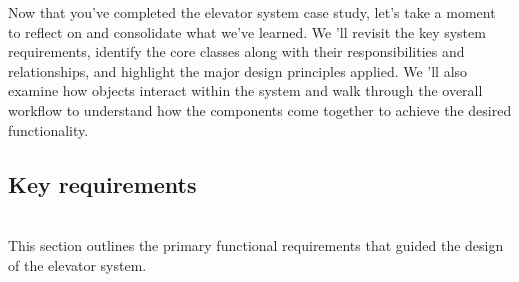 

Now that you've completed the elevator system case study, let's take a moment to reflect on and consolidate what we've learned. We 'll revisit the key system requirements, identify the core classes along with their responsibilities and relationships, and highlight the major design principles applied. We
'll also examine how objects interact within the system and walk through the overall workflow to understand how the components come together to achieve the desired functionality.

\subsection{Key requirements}\label{QJKne63Qmki8VtY1ba7-o}
\\
This section outlines the primary functional requirements that guided the design of the elevator system.

